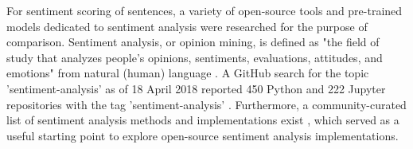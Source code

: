 \documentclass{report}
\begin{document}
For sentiment scoring of sentences, a variety of open-source tools and pre-trained models dedicated to sentiment analysis were researched for the purpose of comparison.
Sentiment analysis, or opinion mining, is defined as "the field of study that analyzes people's opinions, sentiments, evaluations, attitudes, and emotions" from natural (human) language \cite{liu2012sentiment}.
A GitHub search for the topic 'sentiment-analysis' as of 18 April 2018 reported 450 Python and 222 Jupyter repositories with the tag 'sentiment-analysis' \cite{GitHub-sentiment-analysis}.
Furthermore, a community-curated list of sentiment analysis methods and implementations exist \cite{awesome-sentiment-analysis}, which served as a useful starting point to explore open-source sentiment analysis implementations.
\end{document}
